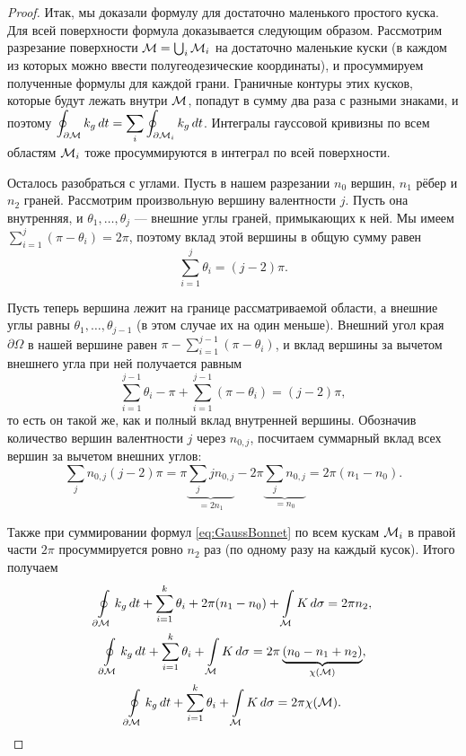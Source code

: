 \begin{proof}
	Итак, мы доказали формулу для достаточно маленького простого куска. Для всей поверхности формула доказывается следующим образом. Рассмотрим разрезание поверхности $\mathcal{M} = \bigcup_i\mathcal{M}_i$ на достаточно маленькие куски (в каждом из которых можно ввести полугеодезические координаты), и просуммируем полученные формулы для каждой грани. Граничные контуры этих кусков, которые будут лежать внутри $\mathcal{M}$, попадут в сумму два раза с разными знаками, и поэтому $\displaystyle\oint_{\partial \mathcal{M}}k_g\,dt = \sum_i\oint_{\partial \mathcal{M}_i}k_g\,dt$. Интегралы гауссовой кривизны по всем областям $\mathcal{M}_i$ тоже просуммируются в интеграл по всей поверхности.

	Осталось разобраться с углами. Пусть в нашем разрезании $n_0$ вершин, $n_1$ рёбер и $n_2$ граней. Рассмотрим произвольную вершину валентности $j$. Пусть она внутренняя, и $\theta_1, \ldots, \theta_j$ --- внешние углы граней, примыкающих к ней. Мы имеем $\sum\limits_{i = 1}^j(\pi - \theta_i) = 2\pi$, поэтому вклад этой вершины в общую сумму равен
	\[
		\sum_{i = 1}^j\theta_i = (j - 2)\pi.
	\]

	Пусть теперь вершина лежит на границе рассматриваемой области, а внешние углы равны $\theta_1, \ldots, \theta_{j - 1}$ (в этом случае их на один меньше). Внешний угол края $\partial\Omega$ в нашей вершине равен $\pi - \sum\limits_{i = 1}^{j - 1}(\pi - \theta_i)$, и вклад вершины за вычетом внешнего угла при ней получается равным
	\[
		\sum_{i = 1}^{j - 1}\theta_i - \pi + \sum\limits_{i = 1}^{j - 1}(\pi - \theta_i) = (j - 2)\pi,
	\]
	то есть он такой же, как и полный вклад внутренней вершины. Обозначив количество вершин валентности $j$ через $n_{0, j}$, посчитаем суммарный вклад всех вершин за вычетом внешних углов:
	\[
		\sum_jn_{0, j}(j - 2)\pi = \pi{\underbrace{\sum_jjn_{0, j}}_{= 2n_1}} - 2\pi{\underbrace{\sum_jn_{0, j}}_{= n_0}} = 2\pi(n_1 - n_0).
	\]

	Также при суммировании формул \eqref{eq:GaussBonnet} по всем кускам $\mathcal{M}_i$ в правой части $2\pi$ просуммируется ровно $n_2$ раз (по одному разу на каждый кусок). Итого получаем
	\begin{gather*}
		\oint\limits_{\partial\mathcal{M}}k_g\,dt + \sum_{i = 1}^k\theta_i + 2\pi(n_1 - n_0) + \int\limits_{\mathcal{M}}K\,d\sigma = 2\pi n_2,\\
		\oint\limits_{\partial\mathcal{M}}k_g\,dt + \sum_{i = 1}^k\theta_i + \int\limits_{\mathcal{M}}K\,d\sigma = 2\pi\underbrace{(n_0 - n_1 + n_2)}_{\chi(\mathcal{M})},\\
		\oint\limits_{\partial\mathcal{M}}k_g\,dt + \sum_{i = 1}^k\theta_i + \int\limits_{\mathcal{M}}K\,d\sigma = 2\pi\chi(\mathcal{M}).
	\end{gather*}
\end{proof}

